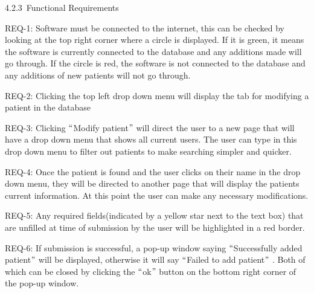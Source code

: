 \documentclass[12pt]{article}
\renewcommand{\_}{\kern-1.5pt\textunderscore\kern-1.5pt}
\begin{document}
4.2.3\  \tab Functional Requirements\par

\begin{adjustwidth}{0.5in}{0.0in}
REQ-1: Software must be connected to the internet, this can be checked by looking at the top right corner where a circle is displayed. If it is green, it means the software is currently connected to the database and any additions made will go through. If the circle is red, the software is not connected to the database and any additions of new patients will not go through.\par

\end{adjustwidth}

\begin{adjustwidth}{0.5in}{0.0in}
REQ-2: Clicking the top left drop down menu will display the tab for modifying a patient in the database\par

\end{adjustwidth}

\begin{adjustwidth}{0.5in}{0.0in}
REQ-3: Clicking $``$Modify patient$"$  will direct the user to a new page that will have a drop down menu that shows all current users. The user can type in this drop down menu to filter out patients to make searching simpler and quicker.\par

\end{adjustwidth}

\begin{adjustwidth}{0.5in}{0.0in}
REQ-4: Once the patient is found and the user clicks on their name in the drop down menu, they will be directed to another page that will display the patients current information. At this point the user can make any necessary modifications.\par

\end{adjustwidth}

\begin{adjustwidth}{0.5in}{0.0in}
REQ-5: Any required fields(indicated by a yellow star next to the text box) that are unfilled at time of submission by the user will be highlighted in a red border. \par

\end{adjustwidth}

\begin{adjustwidth}{0.5in}{0.0in}
REQ-6: If submission is successful, a pop-up window saying $``$Successfully added patient$"$  will be displayed, otherwise it will say $``$Failed to add patient$"$ . Both of which can be closed by clicking the $``$ok$"$  button on the bottom right corner of the pop-up window.\par

\end{adjustwidth}
\end{document}
